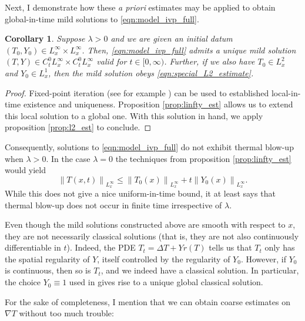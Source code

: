 \documentclass[twosided, 12pt]{article}
\numberwithin{equation}{section}
\theoremstyle{plain}
\newtheorem{cor}[thm]{Corollary}
\begin{document}
\par Next, I demonstrate how these \textit{a priori} estimates may be applied to obtain global-in-time mild solutions to \eqref{eqn:model_ivp_full}. 
\begin{cor}\label{cor:linfty_gwp}
      Suppose $\lambda>0$ and we are given an initial datum $\left(T_0, Y_0\right)\in L^{\infty}_{x}\times L^{\infty}_{x}$. Then, \eqref{eqn:model_ivp_full} admits a unique mild solution $(T,Y)\in C^0_t L^{\infty}_{x}\times C^0_t L^{\infty}_{x}$ valid for $t\in [0,\infty)$. Further, if we also have $T_0\in L^2_{x}$ and $Y_0\in L^1_x$, then the mild solution obeys \eqref{eqn:special_L2_estimate}. 
\end{cor}
\begin{proof}
    Fixed-point iteration (see for example \cite{Tao2006}) can be used to established local-in-time existence and uniqueness. Proposition \ref{prop:linfty_est} allows us to extend this local solution to a global one. With this solution in hand, we apply proposition \ref{prop:l2_est} to conclude.
\end{proof}
\noindent Consequently, solutions to \eqref{eqn:model_ivp_full} do not exhibit thermal blow-up when $\lambda>0$. In the case $\lambda=0$ the techniques from proposition \ref{prop:linfty_est} would yield
\begin{equation*}
 \left\|T(x,t)\right\|_{L^{\infty}_{x}} \leq\left\|T_0(x)\right\|_{L^{\infty}_{x}} + t\left\|Y_0(x)\right\|_{L^{\infty}_{x}}. 
\end{equation*}
While this does not give a nice uniform-in-time bound, it at least says that thermal blow-up does not occur in finite time irrespective of $\lambda$. 
\par Even though the mild solutions constructed above are smooth with respect to $x$, they are not necessarily classical solutions (that is, they are not also continuously differentiable in $t$). Indeed, the PDE $T_t = \Delta T + Yr(T)$ tells us that $T_t$ only has the spatial regularity of $Y$, itself controlled by the regularity of $Y_0$. However, if $Y_0$ is continuous, then so is $T_t$, and we indeed have a classical solution. In particular, the choice $Y_0\equiv 1$ used in \cite{Mandel_etal_2008} gives rise to a unique global classical solution.
\par For the sake of completeness, I mention that we can obtain coarse estimates on $\nabla T$ without too much trouble:
\end{document}
